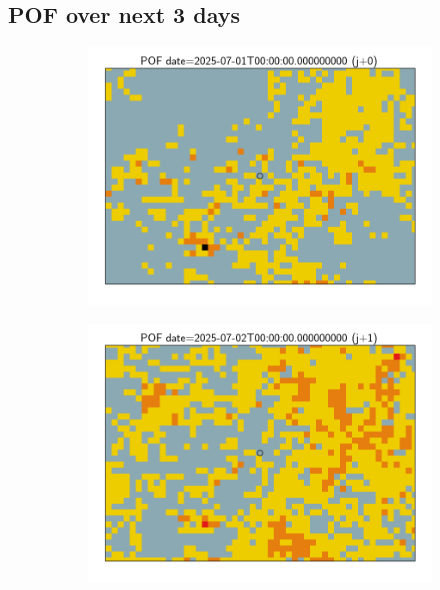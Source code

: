 \documentclass{article}
\begin{document}
\subsection*{POF over next 3 days}
\vspace{-1em}
\begin{figure}[H]
    \centering
    \begin{subfigure}[b]{0.31\textwidth}
        \centering
        \includegraphics[width=\linewidth]{pof_161_j0.png} %
    \end{subfigure}
    \begin{subfigure}[b]{0.31\textwidth}
        \centering
        \includegraphics[width=\linewidth]{pof_161_j1.png} %

\end{subfigure}
\end{figure}
\end{document}

